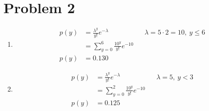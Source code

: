 \documentclass[13pt]{article}
\begin{document}
\newpage
\section*{Problem 2}
\begin{enumerate}[label=(\alph*)]
\item
  \begin{align*}
    p(y) &= \frac{\lambda^{y}}{y!}e^{-\lambda} && \lambda = 5 \cdot 2 =
                                                  10, \ y \leq 6 \\
         &= \sum_{y = 0}^{6} \frac{10^{y}}{y!}e^{-10} \\
    p(y) &= 0.130
  \end{align*}

\item
  \begin{align*}
    p(y) &= \frac{\lambda^{y}}{y!}e^{-\lambda} && \lambda = 5, \ y < 3 \\
         &= \sum_{y = 0}^{2} \frac{10^{y}}{y!}e^{-10} \\
    p(y) &= 0.125
  \end{align*}
  

\end{enumerate}
\end{document}
